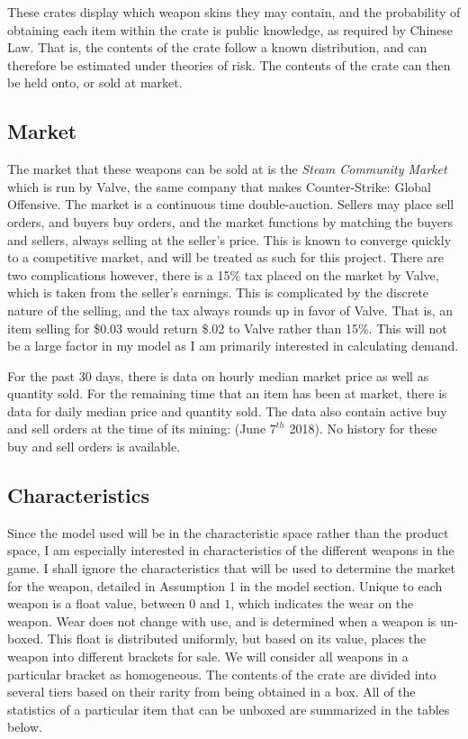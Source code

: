 \documentclass[12pt]{paper}
\begin{document}
These crates display which weapon skins they may contain, and the
probability of obtaining each item within the crate is public
knowledge, as required by Chinese Law. That is, the contents of the
crate follow a known distribution, and can therefore be estimated
under theories of risk. The contents of the crate can then be held
onto, or sold at market.
 

\subsection{Market}


The market that these weapons can be sold at is the \emph{Steam
  Community Market} which is run by Valve, the same company that makes
Counter-Strike: Global Offensive. The market is a continuous time
double-auction. Sellers may place sell orders, and buyers buy orders,
and the market functions by matching the buyers and sellers, always
selling at the seller's price. This is known to converge quickly to a
competitive market, and will be treated as such for this
project. \cite{Efficiency} There are two complications however, there is a 15\% tax
placed on the market by Valve, which is taken from the seller's
earnings. This is complicated by the discrete nature of the selling,
and the tax always rounds up in favor of Valve. That is, an item
selling for \$0.03 would return \$.02 to Valve rather than 15\%. This
will not be a large factor in my model as I am primarily interested in
calculating demand.

For the past 30 days, there is data on hourly median market price as
well as quantity sold. For the remaining time that an item has been at
market, there is data for daily median price and quantity sold. The
data also contain active buy and sell orders at the time of its
mining: (June $7^{th}$ 2018). No history for these buy and sell orders
is available.

\subsection{Characteristics}

Since the model used will be in the characteristic space rather than
the product space, I am especially interested in characteristics of
the different weapons in the game. I shall ignore the characteristics
that will be used to determine the market for the weapon, detailed in
Assumption 1 in the model section. Unique to each weapon is a float
value, between $0$ and $1$, which indicates the wear on the
weapon. Wear does not change with use, and is determined when a weapon
is un-boxed. This float is distributed uniformly, but based on its
value, places the weapon into different brackets for sale. We will
consider all weapons in a particular bracket as homogeneous. The
contents of the crate are divided into several tiers based on their
rarity from being obtained in a box. All of the statistics of a
particular item that can be unboxed are summarized in the tables
below.
\end{document}
